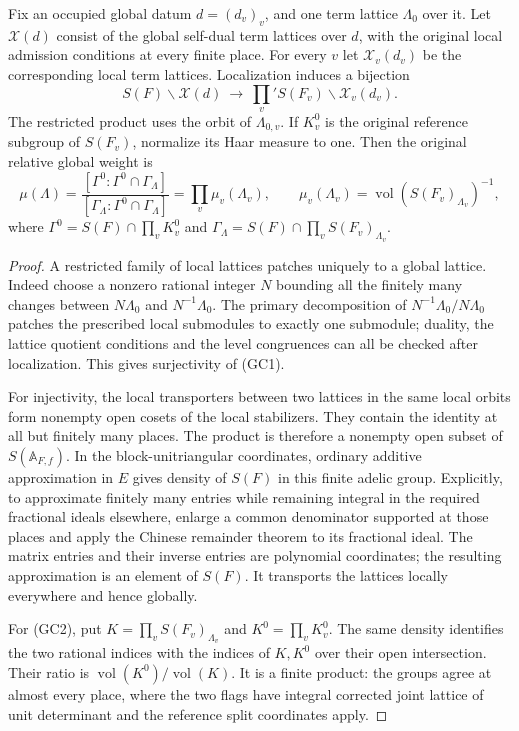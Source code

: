\begin{lemma}\label{lem:generic-global-orbits}
Fix an occupied global datum \(d=(d_v)_v\), and one term lattice
\(\Lambda_0\) over it. Let \(\mathcal X(d)\) consist of the global
self-dual term lattices over \(d\), with the original local
admission conditions at every finite place. For every \(v\) let
\(\mathcal X_v(d_v)\) be the corresponding local term lattices.
Localization induces a bijection
\[
 S(F)\backslash\mathcal X(d)\ \longrightarrow\
       \prod_v' S(F_v)\backslash\mathcal X_v(d_v).
 \tag{GC1}
\]
The restricted product uses the orbit of \(\Lambda_{0,v}\).
If \(K_v^0\) is the original reference subgroup of \(S(F_v)\),
normalize its Haar measure to one. Then the original relative
global weight is
\[
 \mu(\Lambda)=
 \frac{[\Gamma^0:\Gamma^0\cap\Gamma_\Lambda]}
      {[\Gamma_\Lambda:\Gamma^0\cap\Gamma_\Lambda]}
      =\prod_v\mu_v(\Lambda_v),
 \qquad
 \mu_v(\Lambda_v)=
       \operatorname{vol}(S(F_v)_{\Lambda_v})^{-1},
 \tag{GC2}
\]
where \(\Gamma^0=S(F)\cap\prod_vK_v^0\) and
\(\Gamma_\Lambda=S(F)\cap\prod_v S(F_v)_{\Lambda_v}\).
\end{lemma}
\begin{proof}
A restricted family of local lattices patches uniquely to a global
lattice. Indeed choose a nonzero rational integer \(N\) bounding all
the finitely many changes between \(N\Lambda_0\) and
\(N^{-1}\Lambda_0\). The primary decomposition of
\(N^{-1}\Lambda_0/N\Lambda_0\) patches the prescribed local submodules
to exactly one submodule; duality, the lattice quotient conditions
and the level congruences can all be checked after localization.
This gives surjectivity of (GC1).

For injectivity, the local transporters between two lattices in the
same local orbits form nonempty open cosets of the local stabilizers.
They contain the identity at all but finitely many places. The
product is therefore a nonempty open subset of \(S(\mathbb A_{F,f})\).
In the block-unitriangular coordinates, ordinary additive
approximation in \(E\) gives density of \(S(F)\) in this finite
adelic group. Explicitly, to approximate finitely many entries
while remaining integral in the required fractional ideals
elsewhere, enlarge a common denominator supported at those
places and apply the Chinese remainder theorem to its fractional
ideal. The matrix entries and their inverse entries are polynomial
coordinates; the resulting approximation is an element of \(S(F)\).
It transports the lattices locally everywhere and hence globally.

For (GC2), put \(K=\prod_v S(F_v)_{\Lambda_v}\) and
\(K^0=\prod_vK_v^0\). The same density identifies the two rational
indices with the indices of \(K,K^0\) over their open intersection.
Their ratio is \(\operatorname{vol}(K^0)/\operatorname{vol}(K)\).
It is a finite product: the groups agree at almost every place,
where the two flags have integral corrected joint lattice of unit
determinant and the reference split coordinates apply.
\end{proof}

